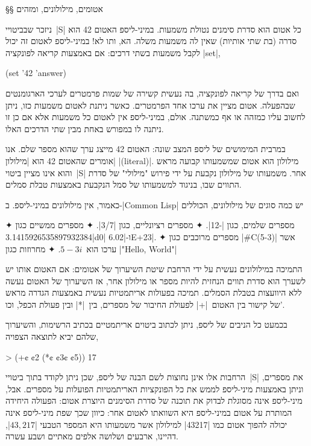 §§ אטומים, מילולונים, ומזהים

ניזכר שבביטויי~\E|S| כל אטום הוא סדרת סימנים נטולת משמעות. במיני-ליספ
האטום 42 הוא סדרה (בת שתי אותיות) שאין לה משמעות משלה. הא, ותו לא! במיני-ליספ
לאטום זה יכול לקבל משמעות בשתי דרכים: אם באמצעות קריאה לפונקציה
\E|set|,
\begin{LISP}
(set '42 'answer)
\end{LISP}
ואם בדרך של קריאה לפונקציה, בה נעשית קשירה של שמות פרמטרים לערכי הארגומנטים
שבהפעלה. אטום מציין את ערכו אחד הפרמטרים. כאשר ניתנת לאטום משמעות כזו, ניתן
לחשוב עליו כמזהה או אף כמשתנה. אולם, במיני-ליספ אין לאטום כל משמעות אלא אם כן
זו ניתנה לו במפורש באחת מבין שתי הדרכים האלו.

במרבית המימושים של ליספ המצב שונה: האטום 42 מייצג ערך שהוא מספר שלם. אנו אומרים
שהאטום 42 הוא \ע|מילולון| \E|(literal)|. מילולון הוא אטום שמשמעותו קבועה מראש
והוא אינו מציין ביטוי~\E|S| אחר. משמעותו של מילולון נקבעת על ידי פירוש "מילולי"
של סדרת התווים שבו, בניגוד למשמעותו של סמל הנקבעת באמצעות טבלת סמלים.

כאמור, אין מילולונים במיני-ליספ. ב-\E|Common Lisp| יש כמה סוגים של מילולונים,
הכוללים
\begin{enumerate}
  ✦ מספרים שלמים, כגון \T|-12|.
  ✦ מספרים רציונליים, כגון \T|3/7|.
  ✦ מספרים ממשיים כגון \T|3.1415926535897932384d0| ו-\T|6.02E+23|.
  ✦ מספרים מרוכבים כגון \T|#C(5-3)| אשר ערכו הוא~$5-3i$.
  ✦ מחרוזות כגון \T|"Hello, World"|
\end{enumerate}

התמיכה במילולונים נעשית על ידי הרחבת שיטת השיערוך של אטומים: אם האטום אותו יש
לשערך הוא סדרת תווים הנחזית להיות מספר או מילולון אחר, אז השיערוך של האטום נעשה
ללא היוועצות בטבלת הסמלים. תמיכה בפעולות אריתמטיות נעשית באמצעות הגדרה מראש של
קישור בין האטום~\T|+| לפעולת החיבור של מספרים, בין~\T|*| ובין פעולת הכפל,
וכו'.

בכמעט כל הניבים של ליספ, ניתן לכתוב ביטוים אריתמטיים בכתיב הרשימות, והשיערוך
שלהם יביא לתוצאה הצפויה,

\begin{LISP}
> (+¢ ¢2 (*¢ ¢3¢ ¢5))
17
\end{LISP}

הרחבות אלו אינן נחוצות לשם הבנה של ליספ, שכן ניתן לקודד בתוך ביטויי~\E|S| את
מספרים, וניתן באמצעות מיני-ליספ לממש את כל הפונקציות האריתמטיות הפועלות על
מספרים. אבל, מיני-ליספ אינה מסוגלת לבדוק את תוכנה של סדרת הסימנים היוצרת אטום:
הפעולה היחידה המותרת על אטום במיני-ליספ היא השוואתו לאטום אחר: כיוון שכך שפת
מיני-ליספ אינה יכולה להפוך אטום כמו \T|43217| למילולון אשר משמעותו היא המספר
הטבעי \E|$43,217$|, דהיינו, ארבעים ושלושה אלפים מאתיים ושבע עשרה.

